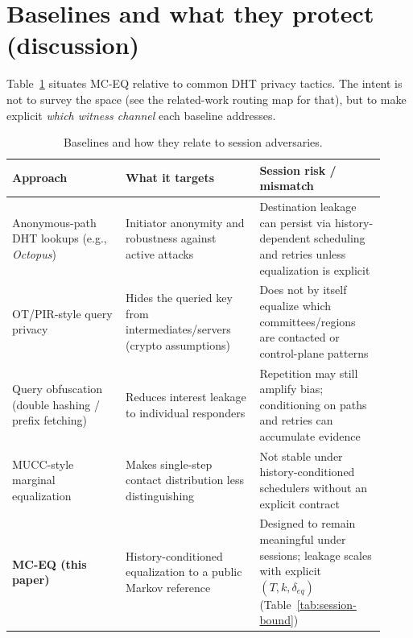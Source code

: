 \documentclass[11pt]{article}
\begin{document}
\section{Baselines and what they protect (discussion)}
\label{sec:baselines}
Table~\ref{tab:baseline-map} situates MC-EQ relative to common DHT privacy tactics.
The intent is not to survey the space (see the related-work routing map for that),\cite{series:relatedworkmap} but to make explicit \emph{which witness channel} each baseline addresses.

\begin{table}[t]
\centering
\small
\begin{tabular}{@{}p{0.28\linewidth}p{0.33\linewidth}p{0.31\linewidth}@{}}
\toprule
Approach & What it targets & Session risk / mismatch \\
\midrule
Anonymous-path DHT lookups (e.g., \textit{Octopus}) \cite{wang2012octopus} &
Initiator anonymity and robustness against active attacks &
Destination leakage can persist via history-dependent scheduling and retries unless equalization is explicit \\
OT/PIR-style query privacy \cite{backes2012queryprivacy,mazmudar2024peer2pir} &
Hides the queried key from intermediates/servers (crypto assumptions) &
Does not by itself equalize which committees/regions are contacted or control-plane patterns \\
Query obfuscation (double hashing / prefix fetching) \cite{daniel2025kademliaobf} &
Reduces interest leakage to individual responders &
Repetition may still amplify bias; conditioning on paths and retries can accumulate evidence \\
MUCC-style marginal equalization \cite{series:state2} &
Makes single-step contact distribution less distinguishing &
Not stable under history-conditioned schedulers without an explicit contract \\
\textbf{MC-EQ (this paper)} &
History-conditioned equalization to a public Markov reference &
Designed to remain meaningful under sessions; leakage scales with explicit $(T,k,\delta_{eq})$ (Table~\ref{tab:session-bound}) \\
\bottomrule
\end{tabular}
\caption{Baselines and how they relate to session adversaries.}
\label{tab:baseline-map}
\end{table}
\end{document}
